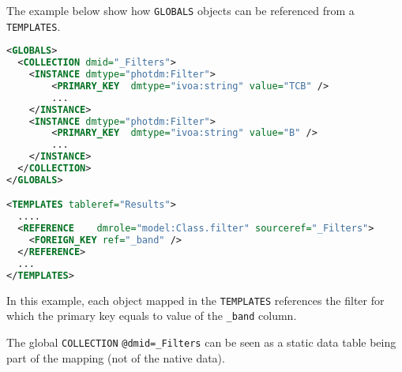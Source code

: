 The example below show how \texttt{GLOBALS} objects can be referenced from a  \texttt{TEMPLATES}. 

\begin{lstlisting}[caption={Dynamic reference example},language=XML]
<GLOBALS>
  <COLLECTION dmid="_Filters">
    <INSTANCE dmtype="photdm:Filter">
		<PRIMARY_KEY  dmtype="ivoa:string" value="TCB" />
		...
	</INSTANCE>
	<INSTANCE dmtype="photdm:Filter">
		<PRIMARY_KEY  dmtype="ivoa:string" value="B" />
		...
	</INSTANCE>
  </COLLECTION>
</GLOBALS>

<TEMPLATES tableref="Results">
  ....
  <REFERENCE	dmrole="model:Class.filter"	sourceref="_Filters">
    <FOREIGN_KEY ref="_band" />
  </REFERENCE>
  ...
</TEMPLATES>

\end{lstlisting}  

In this example, each object mapped in the \texttt{TEMPLATES} references the filter for which the primary key equals to value of the \texttt{\_band} column.

The global \texttt{COLLECTION} \texttt{@dmid=\_Filters} can be seen as a static data table being part of the mapping (not of the native data).

